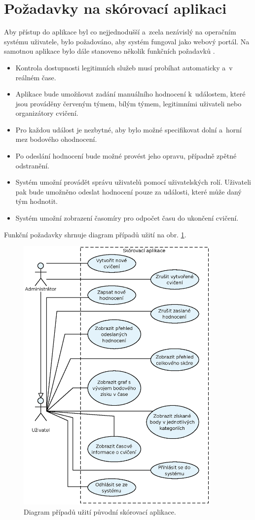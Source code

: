 \documentclass[
  digital,
  twoside,
  table, 
  nolof, 
  nolot
]{fithesis3}
\begin{document}
\section{Požadavky na skórovací aplikaci}

Aby přístup do aplikace byl co nejjednodušší a~zcela nezávislý na operačním systému uživatele, bylo požadováno, aby systém fungoval jako webový portál. Na samotnou aplikace bylo dále stanoveno několik funkčních požadavků \cite{Kostelnik2016thesis}.

\begin{itemize}
\item Kontrola dostupnosti legitimních služeb musí probíhat automaticky a~v reálném čase.
\item Aplikace bude umožňovat zadání manuálního hodnocení k~událostem, které jsou prováděny červeným týmem, bílým týmem, legitimními uživateli nebo organizátory cvičení.
\item Pro každou událost je nezbytné, aby bylo možné specifikovat dolní a~horní mez bodového ohodnocení.
\item Po odeslání hodnocení bude možné provést jeho opravu, případně zpětné odstranění.
\item Systém umožní provádět správu uživatelů pomocí uživatelských rolí. Uživateli pak bude umožněno odeslat hodnocení pouze za události, které může daný tým hodnotit.
\item Systém umožní zobrazení časomíry pro odpočet času do ukončení cvičení.
\end{itemize}

Funkční požadavky shrnuje diagram případů užití na obr. \ref{fig:useCase1}.

\begin{figure}[h!]
    \centering
    \includegraphics[width=10cm]{images/Use-case-1.eps}
    \caption{Diagram případů užití původní skórovací aplikace.}
    \label{fig:useCase1}
\end{figure}
\end{document}
